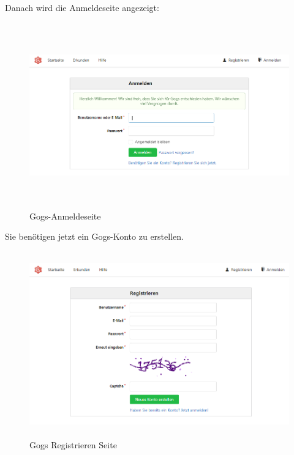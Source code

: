 \documentclass[a4paper,12pt,oneside]{book}
\begin{document}
Danach wird die Anmeldeseite angezeigt:
\begin{figure}[h!]
	\begin{center}
		\includegraphics[width=17cm, height=8cm]{anmeldeseite.PNG}
		\caption{Gogs-Anmeldeseite} 
		\label{Anmeldeseite} 
	\end{center}
\end{figure}
\newpage
Sie benötigen jetzt ein Gogs-Konto zu erstellen.
\begin{figure}[h!]
	\begin{center}
		\includegraphics[width=17cm, height=8cm]{gogs-registrieren-seite.PNG}
		\caption{Gogs Registrieren Seite} 
		\label{Gogs Registrieren Seite} 
	\end{center}
\end{figure}
\end{document}
